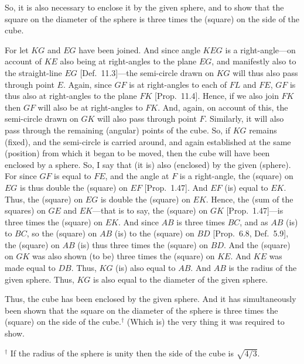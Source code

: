 \begin{Parallel}{}{}
{So, it is also necessary
to enclose it by the given sphere, and to show that the square on
the diameter of the sphere is three times the (square) on the side of the cube.

\centerline{}

For let $KG$ and $EG$ have been joined. And since
angle $KEG$ is a right-angle---on account of $KE$ also being at right-angles
to the plane $EG$, and manifestly also to the straight-line $EG$ [Def.~11.3]---the semi-circle drawn on $KG$ will thus also pass through
point $E$. Again, since $GF$ is at right-angles to each of $FL$
and $FE$, $GF$ is thus also at right-angles to the plane $FK$ [Prop.~11.4]. 
Hence, if we also join $FK$ then $GF$ will also be at right-angles to
$FK$. And, again, on account of this, the semi-circle drawn on
$GK$ will also pass through point $F$. Similarly, it will also pass through
the remaining (angular) points of the cube. So, if $KG$ remains (fixed), 
and the semi-circle is carried around, and again established at the
same (position) from which it began to be moved, then the cube will
have been enclosed by a sphere. So, I say that (it is) also (enclosed)
by the given (sphere). For since $GF$ is equal to $FE$, and the
angle at $F$ is a right-angle, the (square) on $EG$ is thus double
the (square) on $EF$ [Prop.~1.47]. And $EF$ (is) equal to
$EK$. Thus, the (square) on $EG$ is double the (square) on $EK$.
Hence, the (sum of the squares) on $GE$ and $EK$---that is to say, the
(square) on $GK$ [Prop.~1.47]---is three times the  (square) on $EK$. And since
$AB$ is three times $BC$, and as $AB$ (is) to $BC$, so the
(square) on $AB$ (is) to the (square) on $BD$ [Prop.~6.8, Def.~5.9], 
the (square) on $AB$ (is) thus three times the (square) on $BD$. 
And the (square) on $GK$ was also shown (to be) three times
the (square) on $KE$. And $KE$ was made equal to $DB$. 
Thus, $KG$ (is) also equal to $AB$. And $AB$ is the
radius of the given sphere. Thus, $KG$ is also equal to the diameter of the
given sphere.

Thus, the cube has been enclosed by the given sphere. And it
has simultaneously been shown that the square on the diameter of
the sphere is three times the (square) on the side of the cube.$^\dag$ (Which is)
the very thing it was required to show.}
\end{Parallel}
{\footnotesize\noindent$^\dag$ If the radius of the sphere is unity 
then the side of the cube is $\sqrt{4/3}$.}

